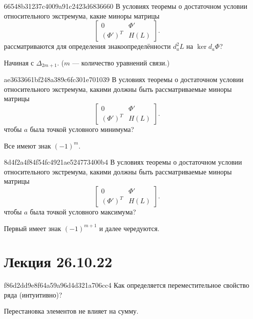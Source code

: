 \begin{note}{66548b31237c4009a91c2423d6836660}
    В условиях теоремы о достаточном условии относительного экстремума, какие миноры матрицы
    \[
        \begin{bmatrix}
            0 & \Phi' \\
            (\Phi')^{T} & H(L)
        \end{bmatrix}.
    \]
    рассматриваются для определения знакоопределённости \({ d^2_{a}L }\) на \({ \ker d_{a} \Phi }\)?

    \begin{cloze}{1}
        Начиная с \({ \Delta_{2m + 1} }\). \quad (\({ m }\) --- количество уравнений связи.)
    \end{cloze}
\end{note}

\begin{note}{ae3633661bf248a389c6fc301e701039}
    В условиях теоремы о достаточном условии относительного экстремума, какими должны быть рассматриваемые миноры матрицы
    \[
        \begin{bmatrix}
            0 & \Phi' \\
            (\Phi')^{T} & H(L)
        \end{bmatrix}.
    \]
    чтобы \({ a }\) была точкой условного минимума?

    \begin{cloze}{1}
        Все имеют знак \({ (-1)^{m} }\).
    \end{cloze}
\end{note}

\begin{note}{8d4f2a4f84f54fc4921ae524773400b4}
    В условиях теоремы о достаточном условии относительного экстремума, какими должны быть рассматриваемые миноры матрицы
    \[
        \begin{bmatrix}
            0 & \Phi' \\
            (\Phi')^{T} & H(L)
        \end{bmatrix}.
    \]
    чтобы \({ a }\) была точкой условного максимума?

    \begin{cloze}{1}
        Первый имеет знак \({ (-1)^{m + 1} }\) и далее чередуются.
    \end{cloze}
\end{note}

\section{Лекция 26.10.22}
\begin{note}{f86d2dd9e8f64a59a96d4d321a706cc4}
    Как определяется переместительное свойство ряда (интуитивно)?

    \begin{cloze}{1}
        Перестановка элементов не влияет на сумму.
    \end{cloze}
\end{note}

